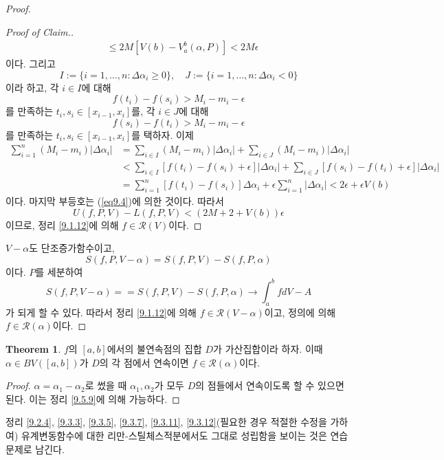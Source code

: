 \documentclass[11pt]{book}
\numberwithin{equation}{chapter}
\def\eps{\epsilon}
\def\calR{\mathcal{R}}
\newcommand{\abs}[1]{\left\vert#1\right\vert}
\theoremstyle{definition}
\newtheorem{thm}{Theorem}[section]
\begin{document}
\begin{proof}
\begin{proof}[Proof of Claim.]
\begin{align*}
            &\le 2M [V(b) - V_a^b(\alpha, P)] < 2M\eps
        \end{align*}
        이다. 그리고
        \[
            I := \{i = 1, \ldots, n : \Delta \alpha_i \ge 0\}, \quad J := \{i = 1, \ldots, n : \Delta \alpha_i < 0\}
        \]
        이라 하고, 각 \(i \in I\)에 대해
        \[
            f(t_i) - f(s_i) > M_i - m_i - \eps
        \]
        를 만족하는 \(t_i, s_i \in [x_{i-1}, x_i]\)를, 각 \(i \in J\)에 대해
        \[
            f(s_i) - f(t_i) > M_i - m_i - \eps
        \]
        를 만족하는 \(t_i, s_i \in [x_{i-1}, x_i]\)를 택하자. 이제
        \begin{align*}
            \sum_{i=1}^n (M_i - m_i) \abs{\Delta \alpha_i} &= \sum_{i \in I} (M_i - m_i) \abs{\Delta \alpha_i} + \sum_{i \in J} (M_i - m_i) \abs{\Delta \alpha_i}\\
            &< \sum_{i \in I} [f(t_i) - f(s_i) + \eps] \abs{\Delta \alpha_i} + \sum_{i \in J} [f(s_i) - f(t_i) + \eps] \abs{\Delta \alpha_i}\\
            &= \sum_{i=1}^n [f(t_i) - f(s_i)] \Delta \alpha_i + \eps \sum_{i=1}^n \abs{\Delta \alpha_i} < 2\eps + \eps V(b)
        \end{align*}
        이다. 마지막 부등호는 (\ref{eq9.4})에 의한 것이다. 따라서
        \[
            U(f, P, V) - L(f, P, V) < (2M + 2 + V(b))\eps
        \]
        이므로, 정리 \ref{9.1.12}에 의해 \(f \in \calR(V)\)이다.
    \end{proof}
    \(V - \alpha\)도 단조증가함수이고,
    \[
        S(f, P, V - \alpha) = S(f, P, V) - S(f, P, \alpha)
    \]
    이다. \(P\)를 세분하여
    \[
        S(f, P, V - \alpha) = = S(f, P, V) - S(f, P, \alpha) \to \int_a^b f dV - A
    \]
    가 되게 할 수 있다. 따라서 정리 \ref{9.1.12}에 의해 \(f \in \calR(V - \alpha)\)이고, 정의에 의해 \(f \in \calR(\alpha)\)이다.
\end{proof}

\begin{thm}
    \(f\)의 \([a, b]\)에서의 불연속점의 집합 \(D\)가 가산집합이라 하자. 이때 \(\alpha \in BV([a, b])\)가 \(D\)의 각 점에서 연속이면 \(f \in \calR(\alpha)\)이다.
\end{thm}
\begin{proof}
    \(\alpha = \alpha_1 - \alpha_2\)로 썼을 때 \(\alpha_1, \alpha_2\)가 모두 \(D\)의 점들에서 연속이도록 할 수 있으면 된다. 이는 정리 \ref{9.5.9}에 의해 가능하다. 
\end{proof}

정리 \ref{9.2.4}, \ref{9.3.3}, \ref{9.3.5}, \ref{9.3.7}, \ref{9.3.11}, \ref{9.3.12}\가 (필요한 경우 적절한 수정을 가하여) 유계변동함수에 대한 리만-스틸체스적분에서도 그대로 성립함을 보이는 것은 연습문제로 남긴다.
\end{document}
